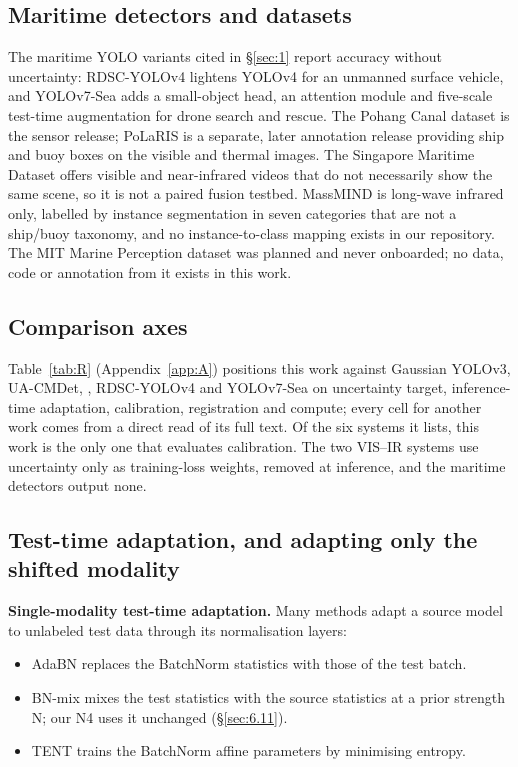 \documentclass[10pt]{article}
\begin{document}
\subsection{Maritime detectors and datasets}\label{sec:2.3}
The maritime YOLO variants cited in \S\ref{sec:1} report accuracy without uncertainty: RDSC-YOLOv4 lightens YOLOv4 for an unmanned surface vehicle, and YOLOv7-Sea adds a small-object head, an attention module and five-scale test-time augmentation for drone search and rescue. The Pohang Canal dataset \citep{chung2023pohang} is the sensor release; PoLaRIS \citep{choi2025polaris} is a separate, later annotation release providing ship and buoy boxes on the visible and thermal images. The Singapore Maritime Dataset \citep{prasad2017video} offers visible and near-infrared videos that do not necessarily show the same scene, so it is not a paired fusion testbed. MassMIND \citep{nirgudkar2023massmind} is long-wave infrared only, labelled by instance segmentation in seven categories that are not a ship/buoy taxonomy, and no instance-to-class mapping exists in our repository. The MIT Marine Perception dataset was planned and never onboarded; no data, code or annotation from it exists in this work.

\subsection{Comparison axes}\label{sec:2.4}
Table~\ref{tab:R} (Appendix~\ref{app:A}) positions this work against Gaussian YOLOv3, UA-CMDet, \citet{zhao2024uncertaintyaware}, RDSC-YOLOv4 and YOLOv7-Sea on uncertainty target, inference-time adaptation, calibration, registration and compute; every cell for another work comes from a direct read of its full text. Of the six systems it lists, this work is the only one that evaluates calibration. The two VIS--IR systems use uncertainty only as training-loss weights, removed at inference, and the maritime detectors output none.

\subsection{Test-time adaptation, and adapting only the shifted modality}\label{sec:2.5}
\textbf{Single-modality test-time adaptation.} Many methods adapt a source model to unlabeled test data through its normalisation layers:
\begin{itemize}
\item AdaBN \citep{li2017revisiting} replaces the BatchNorm statistics with those of the test batch.
\item BN-mix \citep{schneider2020improving} mixes the test statistics with the source statistics at a prior strength N; our N4 uses it unchanged (\S\ref{sec:6.11}).
\item TENT \citep{wang2021tent} trains the BatchNorm affine parameters by minimising entropy.
\end{itemize}
\end{document}
